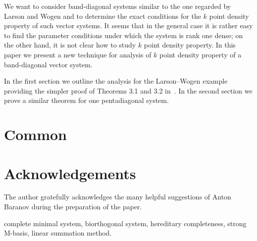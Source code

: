 \documentclass[12pt]{amsart}
\theoremstyle{case}
\begin{document}
    We want to consider band-diagonal systems similar to the one regarded by Larson and Wogen and to determine the exact conditions
      for the $k$ point density property of such vector systems.
    It seems that in the general case it is rather easy to find the parameter conditions under which the system is rank one dense;
      on the other hand, it is not clear how to study $k$ point density property.
    In this paper we present a new technique for analysis of $k$ point density property of a band-diagonal vector system.

    In the first section we outline the analysis for the Larson--Wogen example providing the simpler proof of Theorems 3.1 and 3.2 in~\cite{katavolos}.
    In the second section we prove a similar theorem for one pentadiagonal system.
\section{Common}
  



\section{Acknowledgements}
  The author gratefully acknowledges the many helpful suggestions of Anton Baranov during the preparation of the paper.



 complete minimal system, biorthogonal system, hereditary completeness, strong M-basis, linear summation method.
\end{document}
